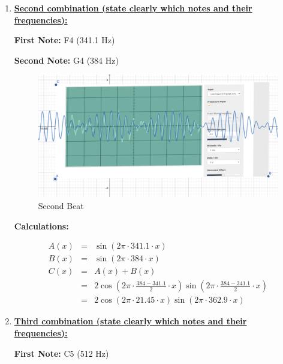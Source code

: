 \documentclass[12pt,oneside]{article}
\begin{document}
\begin{enumerate}
\color{black}
\item \underline{\bf Second combination (state clearly which notes and their frequencies):}
\color{red}

\textbf{First Note:} F4 (341.1 Hz)

\par

\textbf{Second Note:} G4 (384 Hz)

\begin{figure}[H]

{\centering \includegraphics[width=15cm,]{./images/fandg} 

}

\caption{Second Beat}\label{fig:combo-2}
\end{figure}

\textbf{Calculations:}

\begin{eqnarray}
  A(x) & = & \sin (2\pi\cdot 341.1 \cdot x) \\
  B(x) & = & \sin (2\pi\cdot 384\cdot x) \\
  C(x) & = & A(x) + B(x) \\
       & = & 2\cos\left(2\pi\cdot\frac{384-341.1}{2}\cdot x\right)\sin\left(2\pi\cdot\frac{384-341.1}{2}\cdot x\right) \\ 
       & = & 2\cos\left(2\pi\cdot 21.45\cdot x\right)\sin\left(2\pi\cdot 362.9\cdot x\right)
\end{eqnarray}

\color{black}
\item \underline{\bf Third combination (state clearly which notes and their frequencies):}
\color{red}

\textbf{First Note:} C5 (512 Hz)

\par


\end{enumerate}
\end{document}
